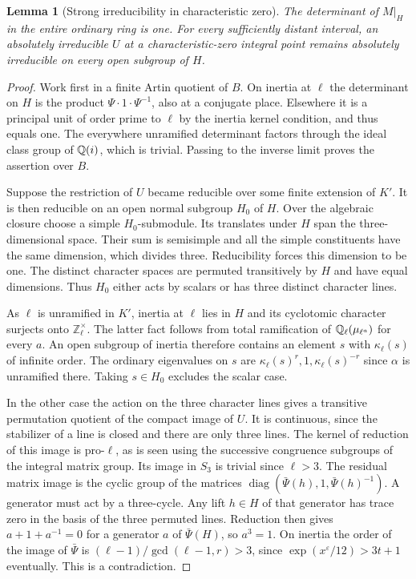 \documentclass[a4paper,11pt]{article}
\newtheorem{lemma}[proposition]{Lemma}
\theoremstyle{definition}
\theoremstyle{remark}
\newcommand{\ZZ}{\mathbb Z}\newcommand{\ord}{\operatorname{ord}}
\numberwithin{equation}{section}
\begin{document}
\begin{lemma}[Strong irreducibility in characteristic zero]
\label{lem:strong119}
The determinant of \(M|_H\) in the entire ordinary ring is one.
For every sufficiently distant interval, an absolutely
irreducible \(U\) at a characteristic-zero integral point remains
absolutely irreducible on every open subgroup of \(H\).
\end{lemma}
\begin{proof}
Work first in a finite Artin quotient of \(B\). On inertia at
\(\ell\) the determinant on \(H\) is the product
\(\Psi\cdot1\cdot\Psi^{-1}\), also at a conjugate place.
Elsewhere it is a principal unit of order prime to \(\ell\) by
the inertia kernel condition, and thus equals one. The
everywhere unramified determinant factors through the ideal
class group of \(\mathbb Q(i)\), which is trivial. Passing to the
inverse limit proves the assertion over \(B\).

Suppose the restriction of \(U\) became reducible over some
finite extension of \(K'\). It is then reducible on an open
normal subgroup \(H_0\) of \(H\). Over the algebraic closure
choose a simple \(H_0\)-submodule. Its translates under \(H\)
span the three-dimensional space. Their sum is semisimple and
all the simple constituents have the same dimension, which
divides three. Reducibility forces this dimension to be one.
The distinct character spaces are permuted transitively by \(H\)
and have equal dimensions. Thus \(H_0\) either acts by scalars
or has three distinct character lines.

As \(\ell\) is unramified in \(K'\), inertia at \(\ell\) lies
in \(H\) and its cyclotomic character surjects onto
\(\ZZ_\ell^\times\). The latter fact follows from total
ramification of \(\mathbb Q_\ell(\mu_{\ell^a})\) for every \(a\).
An open subgroup of inertia therefore contains an element \(s\)
with \(\kappa_\ell(s)\) of infinite order. The ordinary
eigenvalues on \(s\) are \(\kappa_\ell(s)^r,1,\kappa_\ell(s)^{-r}\)
since \(\alpha\) is unramified there. Taking
\(s\in H_0\) excludes the scalar case.

In the other case the action on the three character lines gives
a transitive permutation quotient of the compact image of \(U\).
It is continuous, since the stabilizer of a line is closed and
there are only three lines. The kernel of reduction of this image
is pro-\(\ell\), as is seen using the successive congruence
subgroups of the integral matrix group. Its image in \(S_3\)
is trivial since \(\ell>3\). The residual matrix image is the
cyclic group of the matrices
\(\operatorname{diag}(\bar\Psi(h),1,\bar\Psi(h)^{-1})\).
A generator must act by a three-cycle. Any lift \(h\in H\) of
that generator has trace zero in the basis of the three
permuted lines. Reduction then gives \(a+1+a^{-1}=0\) for a
generator \(a\) of \(\bar\Psi(H)\), so \(a^3=1\). On inertia
the order of the image of \(\bar\Psi\) is
\((\ell-1)/\gcd(\ell-1,r)>3\), since
\(\exp(x^\varepsilon/12)>3t+1\) eventually. This is a
contradiction.
\end{proof}
\end{document}
